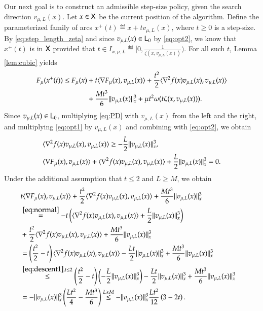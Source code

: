 Our next goal is to construct an admissible step-size policy,  given the search direction $v_{\mu,L}(x)$. 
Let $x\in\mathsf{X}$ be the current position of the algorithm. Define the parameterized family of arcs $x^{+}(t)\eqdef x+t v_{\mu,L}(x)$, where $t\geq 0$ is a step-size. 
By \eqref{eq:step_length_zeta} and since $v_{\mu,L}(x)\in\mathsf{L}_{0}$ by \eqref{eq:opt2}, we know that $x^{+}(t)$ is in $\mathsf{X}$ provided that $t\in I_{x,\mu,L}\eqdef[0,\frac{1}{\zeta(x,v_{\mu,L}(x))})$. For all such $t$, Lemma \ref{lem:cubic} yields  
\begin{equation}\label{eq:SO_potent_upper_bound}
\begin{split}
F_{\mu}(x^{+}(t))\leq F_{\mu}(x)&+t\langle\nabla F_{\mu}(x),v_{\mu,L}(x)\rangle + \frac{t^2}{2}\langle\nabla^{2}f(x)v_{\mu,L}(x),v_{\mu,L}(x)\rangle \\
&+ \frac{Mt^3}{6}\lVert v_{\mu,L}(x)\rVert^{3}_{x}  +\mu t^{2}\omega(t\zeta(x,v_{\mu,L}(x))).
\end{split}
\end{equation}
Since $v_{\mu,L}(x) \in \mathsf{L}_0$, multiplying \eqref{eq:PD} with $v_{\mu,L}(x)$ from the left and the right, and multiplying \eqref{eq:opt1} by $v_{\mu,L}(x)$ and combining with \eqref{eq:opt2}, we obtain
\begin{align}
&\langle\nabla^{2}f(x)v_{\mu,L}(x),v_{\mu,L}(x)\rangle\geq-\frac{L}{2}\lVert v_{\mu,L}(x)\rVert^{3}_{x},\label{eq:descent1}\\
&\langle\nabla F_{\mu}(x),v_{\mu,L}(x)\rangle+\langle\nabla^{2}f(x)v_{\mu,L}(x),v_{\mu,L}(x)\rangle+\frac{L}{2}\lVert v_{\mu,L}(x)\rVert^{3}_{x}=0.\label{eq:normal}
\end{align}
Under the additional assumption that $t\leq 2$ and $L\geq M$, we obtain
\begin{align*}
&t\langle\nabla F_{\mu}(x),v_{\mu,L}(x)\rangle + \frac{t^2}{2}\langle\nabla^{2}f(x)v_{\mu,L}(x),v_{\mu,L}(x)\rangle + \frac{Mt^3}{6}\lVert v_{\mu,L}(x)\rVert^{3}_{x}\\
&\stackrel{\eqref{eq:normal}}{=} - t \left(\langle\nabla^{2}f(x)v_{\mu,L}(x),v_{\mu,L}(x)\rangle+\frac{L}{2}\lVert v_{\mu,L}(x)\rVert^{3}_{x}\right) &\\
&+ \frac{t^2}{2}\langle\nabla^{2}f(x)v_{\mu,L}(x),v_{\mu,L}(x)\rangle + \frac{Mt^3}{6}\lVert v_{\mu,L}(x)\rVert^{3}_{x} \\
& = \left(\frac{t^2}{2} - t \right) \langle\nabla^{2}f(x)v_{\mu,L}(x),v_{\mu,L}(x)\rangle - \frac{Lt}{2}\lVert v_{\mu,L}(x)\rVert^{3}_{x} + \frac{Mt^3}{6}\lVert v_{\mu,L}(x)\rVert^{3}_{x} \\
& \stackrel{\eqref{eq:descent1},t\leq 2}{\leq} \left(\frac{t^2}{2} - t \right) \left(- \frac{L}{2}\lVert v_{\mu,L}(x)\rVert^{3}_{x} \right) - \frac{Lt}{2}\lVert v_{\mu,L}(x)\rVert^{3}_{x} + \frac{Mt^3}{6}\lVert v_{\mu,L}(x)\rVert^{3}_{x} \\
& = - \lVert v_{\mu,L}(x)\rVert^{3}_{x} \left(\frac{Lt^2}{4} - \frac{Mt^3}{6} \right) 
\stackrel{L \geq M}{\leq} - \lVert v_{\mu,L}(x)\rVert^{3}_{x} \frac{Lt^2}{12} \left(3 - 2t \right).
\end{align*}
